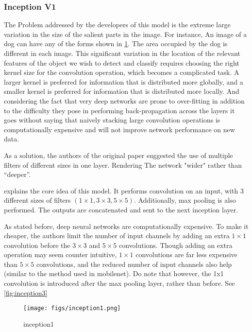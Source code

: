\subsubsection{Inception V1}
The Problem addressed by the developers of this model is the extreme large variation in the size of the salient parts in the image. For instance, An image of a dog can have any of the forms shown in \cref{fig:inception1}. The area occupied by the dog is different in each image. This significant variation in the location of the relevant features of the object we wish to detect and classify requires choosing the right kernel size for the convolution operation, which becomes a complicated task. A larger kernel is preferred for information that is distributed more globally, and a smaller kernel is preferred for information that is distributed more locally. And considering the fact that very deep networks are prone to over-fitting in addition to the difficulty they pose in performing back-propagation across the layers it goes without saying that naively stacking large convolution operations is computationally expensive and will not improve network performance on new data.

As a solution, the authors of the original paper suggested the use of multiple filters of different sizes in one layer. Rendering The network "wider" rather than “deeper”.

 explains the core idea of this model. It performs convolution on an input, with 3 different sizes of filters $(1 \times 1, 3 \times 3, 5 \times 5)$. Additionally, max pooling is also performed. The outputs are concatenated and sent to the next inception layer.

As stated before, deep neural networks are computationally expensive. To make it cheaper, the authors limit the number of input channels by adding an extra $1 \times 1$ convolution before the $3 \times 3$ and $5 \times 5$ convolutions. Though adding an extra operation may seem counter intuitive, $1 \times 1$ convolutions are far less expensive than $5 \times 5$ convolutions, and the reduced number of input channels also help (similar to the method used in mobilenet). Do note that however, the 1x1 convolution is introduced after the max pooling layer, rather than before. See \cref{fig:inception3}


\begin{figure}[ht]
	\centering
	\texttt{[image: figs/inception1.png]}
	\caption{inception1}\label{fig:inception1}
\end{figure}

